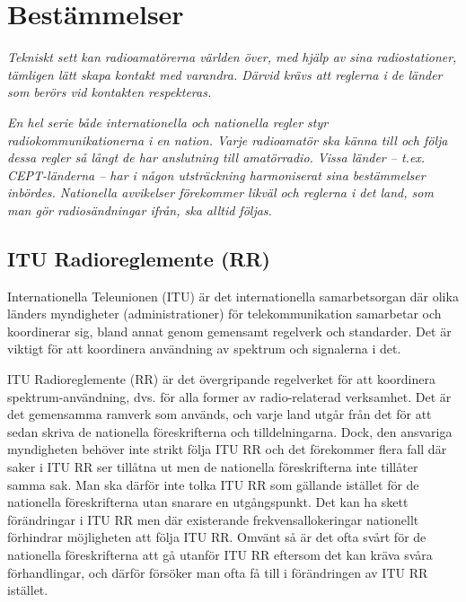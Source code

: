 \chapter{Bestämmelser}

\emph{Tekniskt sett kan radioamatörerna världen över, med hjälp av
  sina radiostationer, tämligen lätt skapa kontakt med varandra.
  Därvid krävs att reglerna i de länder som berörs vid kontakten respekteras.}

\emph{En hel serie både internationella och nationella regler styr
  radiokommunikationerna i en nation.
  Varje radioamatör ska känna till och följa dessa regler så långt de har
  anslutning till amatörradio.
  Vissa länder -- t.ex. CEPT-länderna -- har i någon utsträckning harmoniserat
  sina bestämmelser inbördes.
  Nationella avvikelser förekommer likväl och reglerna i det land, som man gör
  radiosändningar ifrån, ska alltid följas.}

\section{ITU Radioreglemente (RR)}

Internationella Teleunionen (ITU) är det internationella samarbetsorgan där
olika länders myndigheter (administrationer) för telekommunikation samarbetar
och koordinerar sig, bland annat genom gemensamt regelverk och standarder.
Det är viktigt för att koordinera användning av spektrum och signalerna i det.

ITU Radioreglemente (RR) \cite{ITU-RR} är det övergripande regelverket för att
koordinera spektrum-användning, dvs. för alla former av radio-relaterad
verksamhet.
Det är det gemensamma ramverk som används, och varje land utgår från det för att
sedan skriva de nationella föreskrifterna och tilldelningarna.
Dock, den ansvariga myndigheten behöver inte strikt följa ITU RR och det
förekommer flera fall där saker i ITU RR ser tillåtna ut men de nationella
föreskrifterna inte tillåter samma sak.
Man ska därför inte tolka ITU RR som gällande istället för de nationella
föreskrifterna utan snarare en utgångspunkt.
Det kan ha skett förändringar i ITU RR men där existerande frekvensallokeringar
nationellt förhindrar möjligheten att följa ITU RR.
Omvänt så är det ofta svårt för de nationella föreskrifterna att gå utanför
ITU RR eftersom det kan kräva svåra förhandlingar, och därför försöker man ofta
få till i förändringen av ITU RR istället.

